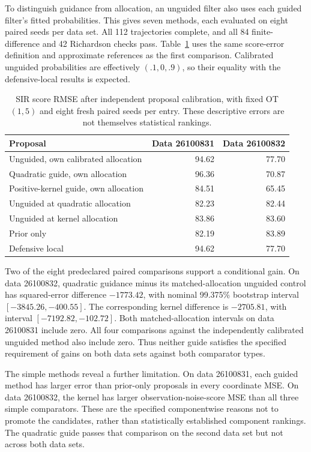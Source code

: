 To distinguish guidance from allocation, an unguided filter also uses each
guided filter's fitted probabilities. This gives seven methods, each evaluated
on eight paired seeds per data set. All 112 trajectories complete, and all
84 finite-difference and 42 Richardson checks pass. Table~\ref{tab:bg-sir-calibrated-results}
uses the same score-error definition and approximate references as the first
comparison. Calibrated unguided probabilities are effectively $(.1,0,.9)$,
so their equality with the defensive-local results is expected.

\begin{table}[htbp]
\centering
\begin{tabular}{lrr}
\hline
Proposal & Data 26100831 & Data 26100832 \\
\hline
Unguided, own calibrated allocation & 94.62 & 77.70 \\
Quadratic guide, own allocation & 96.36 & 70.87 \\
Positive-kernel guide, own allocation & 84.51 & 65.45 \\
Unguided at quadratic allocation & 82.23 & 82.44 \\
Unguided at kernel allocation & 83.86 & 83.60 \\
Prior only & 82.19 & 83.89 \\
Defensive local & 94.62 & 77.70 \\
\hline
\end{tabular}
\caption{SIR score RMSE after independent proposal calibration, with fixed
OT $(1,5)$ and eight fresh paired seeds per entry. These descriptive errors
are not themselves statistical rankings.}
\label{tab:bg-sir-calibrated-results}
\end{table}

Two of the eight predeclared paired comparisons support a conditional gain.
On data 26100832, quadratic guidance minus its matched-allocation unguided
control has squared-error difference $-1773.42$, with nominal 99.375\%
bootstrap interval $[-3845.26,-400.55]$. The corresponding kernel difference
is $-2705.81$, with interval $[-7192.82,-102.72]$. Both matched-allocation
intervals on data 26100831 include zero. All four comparisons against the
independently calibrated unguided method also include zero. Thus neither
guide satisfies the specified requirement of gains on both data sets against
both comparator types.

The simple methods reveal a further limitation. On data 26100831, each
guided method has larger error than prior-only proposals in every coordinate
MSE. On data 26100832, the kernel has larger observation-noise-score MSE than
all three simple comparators. These are the specified componentwise reasons
not to promote the candidates, rather than statistically established
component rankings. The quadratic guide passes that comparison on the second
data set but not across both data sets.

